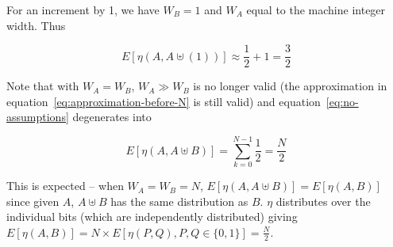 For an increment by 1, we have $W_B = 1$ and $W_A$ equal to the
machine integer width.  Thus

\begin{equation}
  \label{proof:average-2-flips}
  E[\eta(A, A \uplus (1))] \approx \frac{1}{2} + 1 = \frac{3}{2}
\end{equation}

Note that with $W_A = W_B$, $W_A \gg W_B$ is no longer valid (the
approximation in equation~\ref{eq:approximation-before-N} is still
valid) and equation~\ref{eq:no-assumptions} degenerates into

\begin{equation}
  E[\eta(A, A \uplus B)] = \displaystyle\sum\limits_{k=0}^{N - 1} \frac{1}{2} =
  \frac{N}{2}
\end{equation}

This is expected -- when $W_A = W_B = N$, $E[\eta(A, A \uplus B)] =
E[\eta(A, B)]$ since given $A$, $A \uplus B$ has the same distribution as
$B$.  $\eta$ distributes over the individual bits (which are
independently distributed) giving $E[\eta(A, B)] = N \times E[\eta(P,
  Q), P, Q \in \{0, 1\}] = \frac{N}{2}$.
 
